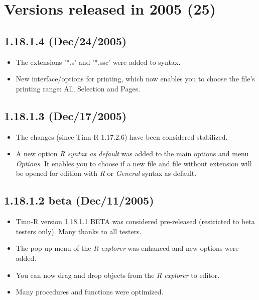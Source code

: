 
\section{Versions released in 2005 (25)}
\subsection{1.18.1.4 (Dec/24/2005)}

\begin{itemize}
  \item The extensions '*.s' and '*.ssc' were added to \RR{} syntax.
  \item New interface/options for printing, which now enables you to
    choose the file's printing range: All, Selection and Pages.
\end{itemize}


\subsection{1.18.1.3 (Dec/17/2005)}

\begin{itemize}
  \item The changes (since Tinn-R 1.17.2.6) have been considered stabilized.
  \item A new option \textit{R syntax as default} was added to the main
    options and menu \textit{Options}. It enables you to choose if a new
    file and file without extension will be opened for edition with \textit{R}
    or \textit{General} syntax as default.
\end{itemize}


\subsection{1.18.1.2 beta (Dec/11/2005)}

\begin{itemize}
  \item Tinn-R version 1.18.1.1 BETA was considered pre-released
    (restricted to beta testers only). Many thanks to all testers.
  \item The pop-up menu of the \textit{R explorer} was enhanced and
    new options were added.
  \item You can now drag and drop objects from the \textit{R explorer}
    to editor.
  \item Many procedures and functions were optimized.
\end{itemize}


